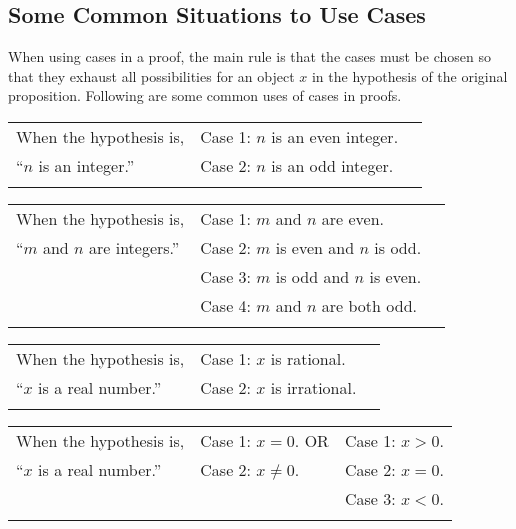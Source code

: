 \subsection*{Some Common Situations to Use Cases}
When using cases in a proof, the main rule is that the cases must be chosen so that they exhaust all possibilities for an object $x$ in the hypothesis of the original proposition.  Following are some common uses of cases in proofs.

\newpar
\begin{tabular}{ l l l }
When the hypothesis is,   & Case 1:  $n$ is an even integer.   & \\
  ``$n$ is an integer.''    & Case 2:  $n$ is an odd integer.     & \\
 & & \\
\end{tabular}

\noindent
\begin{tabular}{ l l l }
When the hypothesis is,         &  Case 1: $m$ and $n$ are even. &  \\
``$m$ and $n$ are integers.''   &  Case 2: $m$ is even and $n$ is odd. & \\
                                &  Case 3: $m$ is odd and $n$ is even. & \\
                                &  Case 4: $m$ and $n$ are both odd. \\
 & & \\
\end{tabular}

\noindent
\begin{tabular}{ l l l } 
When the hypothesis is,     & Case 1:  $x$ is rational.  & \\
 ``$x$ is a real number.''  & Case 2:  $x$ is irrational.  & \\
  &  &    \\
\end{tabular}

\noindent
\begin{tabular}{l l l }
 When the hypothesis is,    & Case 1: $x = 0$. \quad OR & Case 1:  $x>0$.  \\
 ``$x$ is a real number.''  & Case 2: $x \ne 0$.    & Case 2:  $x = 0$. \\
                            &                      & Case 3:  $x<0$. \\
  &  &   \\
\end{tabular}

